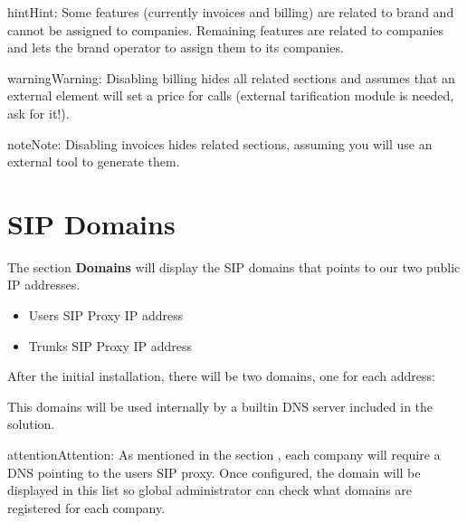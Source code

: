 \documentclass[letterpaper,10pt,english]{sphinxmanual}
\begin{document}
\begin{notice}{hint}{Hint:}
Some features (currently invoices and billing) are related to brand and
cannot be assigned to companies. Remaining features are related to
companies and lets the brand operator to assign them to its companies.
\end{notice}

\begin{notice}{warning}{Warning:}
Disabling billing hides all related sections and assumes that an
external element will set a price for calls (external tarification
module is needed, ask for it!).
\end{notice}

\begin{notice}{note}{Note:}
Disabling invoices hides related sections, assuming you will use an
external tool to generate them.
\end{notice}


\section{SIP Domains}
\label{platform/domains:sip-domains}\label{platform/domains::doc}\label{platform/domains:god-sipdomains}
The section \textbf{Domains} will display the SIP domains that points to our two
public IP addresses.
\begin{itemize}
\item {} 
Users SIP Proxy IP address

\item {} 
Trunks SIP Proxy IP address

\end{itemize}

After the initial installation, there will be two domains, one for each address:

\noindent{}

This domains will be used internally by a builtin DNS server included in the
solution.

\begin{notice}{attention}{Attention:}
As mentioned in the section {\hyperref[getting_started/internal_calls/brand_portal:domain\string-per\string-company]{}}, each
company will require a DNS pointing to the users SIP proxy. Once configured,
the domain will be displayed in this list so global administrator can check
what domains are registered for each company.
\end{notice}
\end{document}
